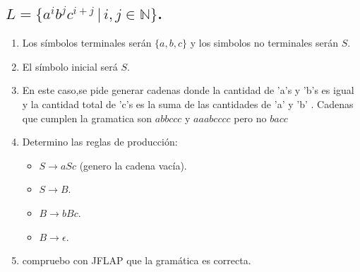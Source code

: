 \documentclass{article}
\begin{document}
        \subsection{$L = \{a^i b^j c^{i+j} \, | \, i, j \in \mathbb{N}\}$.}
        \begin{flushleft}
            \begin{enumerate}
                \item Los símbolos terminales serán $\{a,b,c\}$ y los simbolos no terminales serán $S$.
                \item El símbolo inicial será $S$.
                \item En este caso,se pide generar cadenas donde 
                la cantidad de 'a's y 'b's es igual y la cantidad total de 'c's es la suma de las cantidades de 'a' y 'b'
                . Cadenas que cumplen la gramatica son $abbccc$ y $aaabcccc$ pero no $bacc$
                \item Determino las reglas de producción:
                \begin{itemize}
                    \item $S \rightarrow aSc$ (genero la cadena vacía).
                    \item $S \rightarrow B$.
                    \item $B \rightarrow bBc$.
                    \item $B \rightarrow \epsilon$.
                \end{itemize}
                \item compruebo con JFLAP que la gramática es correcta.
                

\end{enumerate}
\end{flushleft}
\end{document}
